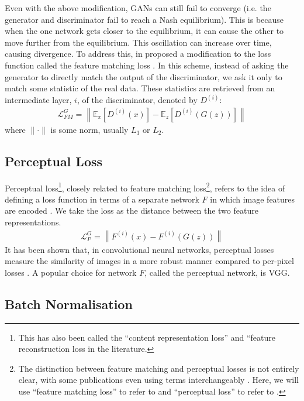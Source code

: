 Even with the above modification, GANs can still fail to converge (i.e. the generator and discriminator fail to reach a Nash equilibrium).
This is because when the one network gets closer to the equilibrium, it can cause the other to move further from the equilibrium.
This oscillation can increase over time, causing divergence.
To address this, in \citeyear{salimans2016} \citeauthor{salimans2016} proposed a modification to the loss function called the feature matching loss \cite{salimans2016}.
In this scheme, instead of asking the generator to directly match the output of the discriminator, we ask it only to match some statistic of the real data.
These statistics are retrieved from an intermediate layer, $i$, of the discriminator, denoted by $D^{(i)}$:
\begin{align} \label{eq:fmloss}
    \mathcal{L}_{FM}^G = \left\lVert \mathbb{E}_x [ D^{(i)}(x)] - \mathbb{E}_z [D^{(i)}(G(z))] \right\rVert
\end{align}
where $\lVert \cdot \rVert$ is some norm, usually $L_1$ or $L_2$.

\subsection{Perceptual Loss}

Perceptual loss\footnote{This has also been called the ``content representation loss'' \cite{Gatys2016} and ``feature reconstruction loss \cite{johnson2016} in the literature.}, closely related to feature matching loss\footnote{The distinction between feature matching and perceptual losses is not entirely clear, with some publications even using terms interchangeably \cite{chen2017}. Here, we will use ``feature matching loss'' to refer to  and ``perceptual loss'' to refer to .}, refers to the idea of defining a loss function in terms of a separate network $F$ in which image features are encoded \cite{Dosovitskiy2016}.
We take the loss as the distance between the two feature representations.
\begin{align} \label{eq:perceptualloss}
    \mathcal{L}_{P}^G = \left\lVert  F^{(i)}(x) - F^{(i)}(G(z)) \right\rVert
\end{align}
It has been shown that, in convolutional neural networks, perceptual losses measure the similarity of images in a more robust manner compared to per-pixel losses \cite{johnson2016}. 
A popular choice for network $F$, called the perceptual network, is VGG.

\subsection{Batch Normalisation} \label{sec:batchnorm}

